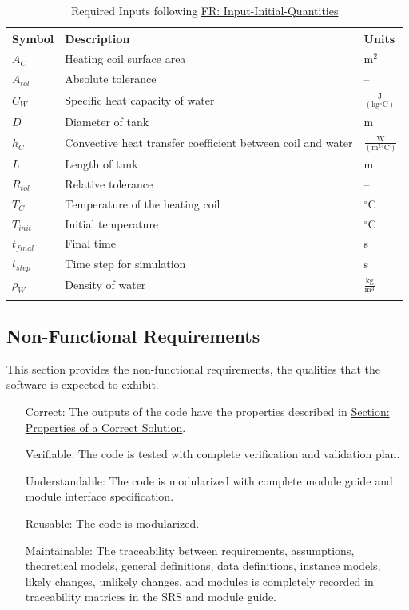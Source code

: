 \documentclass[12pt]{article}
\begin{document}
\begin{longtabu}{l X[l] l}
\toprule
\textbf{Symbol} & \textbf{Description} & \textbf{Units}
\\
\midrule
\endhead
${A_{C}}$ & Heating coil surface area & $\text{m}^{2}$
\\
${A_{tol}}$ & Absolute tolerance & --
\\
${C_{W}}$ & Specific heat capacity of water & $\frac{\text{J}}{(\text{kg}{}^{\circ}\text{C})}$
\\
$D$ & Diameter of tank & m
\\
${h_{C}}$ & Convective heat transfer coefficient between coil and water & $\frac{\text{W}}{(\text{m}^{2}{}^{\circ}\text{C})}$
\\
$L$ & Length of tank & m
\\
${R_{tol}}$ & Relative tolerance & --
\\
${T_{C}}$ & Temperature of the heating coil & ${}^{\circ}$C
\\
${T_{init}}$ & Initial temperature & ${}^{\circ}$C
\\
${t_{final}}$ & Final time & s
\\
${t_{step}}$ & Time step for simulation & s
\\
${ρ_{W}}$ & Density of water & $\frac{\text{kg}}{\text{m}^{3}}$
\\
\bottomrule
\caption{Required Inputs following \hyperref[inputInitQuants]{FR: Input-Initial-Quantities}}
\label{Table:ReqInputs}
\end{longtabu}
\subsection{Non-Functional Requirements}
\label{Sec:NFRs}
This section provides the non-functional requirements, the qualities that the software is expected to exhibit.

\begin{itemize}
\item[Correct:\phantomsection\label{correct}]The outputs of the code have the properties described in \hyperref[Sec:CorSolProps]{Section: Properties of a Correct Solution}.
\item[Verifiable:\phantomsection\label{verifiable}]The code is tested with complete verification and validation plan.
\item[Understandable:\phantomsection\label{understandable}]The code is modularized with complete module guide and module interface specification.
\item[Reusable:\phantomsection\label{reusable}]The code is modularized.
\item[Maintainable:\phantomsection\label{maintainable}]The traceability between requirements, assumptions, theoretical models, general definitions, data definitions, instance models, likely changes, unlikely changes, and modules is completely recorded in traceability matrices in the SRS and module guide.
\end{itemize}
\end{document}
